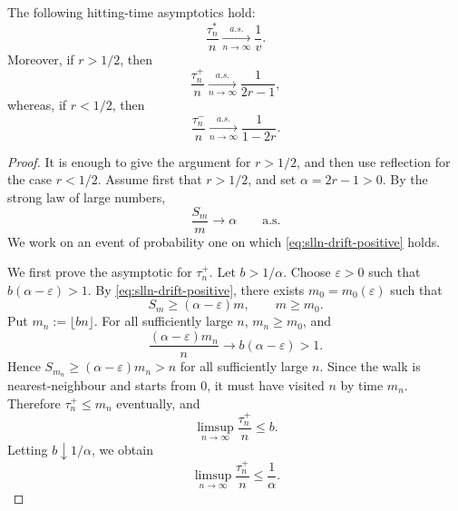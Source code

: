\documentclass[10pt,a4paper]{amsart}
\begin{document}
\begin{lemma}\label{lem:drifted-hitting-time}
The following hitting-time asymptotics hold:
\[
  \frac{\tau_n^*}{n}
  \xrightarrow[n\to\infty]{a.s.}
  \frac1v.
\]
Moreover, if \(r>1/2\), then
\[
  \frac{\tau_n^+}{n}
  \xrightarrow[n\to\infty]{a.s.}
  \frac1{2r-1},
\]
whereas, if \(r<1/2\), then
\[
  \frac{\tau_n^-}{n}
  \xrightarrow[n\to\infty]{a.s.}
  \frac1{1-2r}.
\]
\end{lemma}

\begin{proof}
It is enough to give the argument for \(r>1/2\), and then use reflection for
the case \(r<1/2\). Assume first that \(r>1/2\), and set \(  \alpha=2r-1>0\). By the strong law of large numbers,
\begin{equation}\label{eq:slln-drift-positive}
  \frac{S_m}{m}\longrightarrow \alpha
  \qquad\text{a.s.}
\end{equation}
We work on an event of probability one on which \eqref{eq:slln-drift-positive}
holds.

We first prove the asymptotic for \(\tau_n^+\). Let \(b>1/\alpha\). Choose
\(\varepsilon>0\) such that \(b(\alpha-\varepsilon)>1\). By
\eqref{eq:slln-drift-positive}, there exists \(m_0=m_0(\varepsilon)\) such that
\[
  S_m\ge (\alpha-\varepsilon)m,
  \qquad m\ge m_0 .
\]
Put \(m_n:=\lfloor bn\rfloor\). For all sufficiently large \(n\),
\(m_n\ge m_0\), and
\[
  \frac{(\alpha-\varepsilon)m_n}{n}
  \longrightarrow
  b(\alpha-\varepsilon)>1.
\]
Hence \(S_{m_n}\ge(\alpha-\varepsilon)m_n>n\) for all sufficiently large \(n\).
Since the walk is nearest-neighbour and starts from \(0\), it must have visited
\(n\) by time \(m_n\). Therefore \(\tau_n^+\le m_n\) eventually, and
\[
  \limsup_{n\to\infty}\frac{\tau_n^+}{n}\le b.
\]
Letting \(b\downarrow1/\alpha\), we obtain
\begin{equation}\label{eq:tau-plus-limsup}
  \limsup_{n\to\infty}\frac{\tau_n^+}{n}
  \le
  \frac1\alpha .
\end{equation}


\end{proof}
\end{document}
